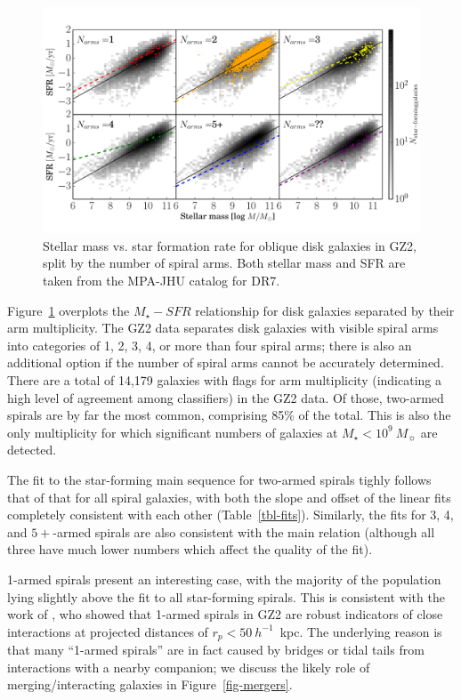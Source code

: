 \documentclass{emulateapj}
\begin{document}
\begin{figure}
\includegraphics[angle=0,width=7.0in]{figures/ms_arms_number.pdf}
\caption{Stellar mass vs. star formation rate for oblique disk galaxies in GZ2, split by the number of spiral arms. Both stellar mass and SFR are taken from the MPA-JHU catalog for DR7. 
\label{fig-number}}
\end{figure}

Figure~\ref{fig-number} overplots the $M_\star-SFR$ relationship for disk galaxies separated by their arm multiplicity. The GZ2 data separates disk galaxies with visible spiral arms into categories of 1, 2, 3, 4, or more than four spiral arms; there is also an additional option if the number of spiral arms cannot be accurately determined. There are a total of 14,179 galaxies with flags for arm multiplicity (indicating a high level of agreement among classifiers) in the GZ2 data. Of those, two-armed spirals are by far the most common, comprising 85\% of the total. This is also the only multiplicity for which significant numbers of galaxies at $M_\star<10^9~M_\sun$ are detected. 

The fit to the star-forming main sequence for two-armed spirals tighly follows that of that for all spiral galaxies, with both the slope and offset of the linear fits completely consistent with each other (Table~\ref{tbl-fits}). Similarly, the fits for 3, 4, and $5+$-armed spirals are also consistent with the main relation (although all three have much lower numbers which affect the quality of the fit). 

1-armed spirals present an interesting case, with the majority of the population lying slightly above the fit to all star-forming spirals. This is consistent with the work of \citet{cas13}, who showed that 1-armed spirals in GZ2 are robust indicators of close interactions at projected distances of $r_p < 50~h^{-1}$~kpc. The underlying reason is that many ``1-armed spirals'' are in fact caused by bridges or tidal tails from interactions with a nearby companion; we discuss the likely role of merging/interacting galaxies in Figure~\ref{fig-mergers}. 
\end{document}
